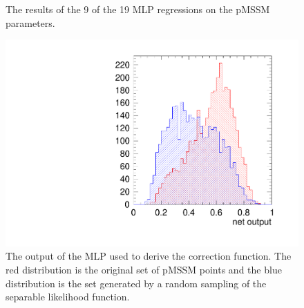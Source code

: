 \begin{figure}[htbp]
{}
\hspace{-8mm}
\hspace{-8mm}
\caption{The results of the 9 of the 19 MLP regressions on the pMSSM parameters. }
\label{fig:KdeMlp2}
\end{figure}

\begin{figure}[h]
\centering
  \includegraphics[width=0.6\linewidth]{figures/pMSSMpaper/Prior/CompareFrequentist/figpmssmnettrain}
\caption{The output of the MLP used to derive the correction function. The red distribution is the original set of pMSSM points and the blue distribution is the set generated by a random sampling of the separable likelihood function. }
\label{fig:Classifier}
\end{figure}



